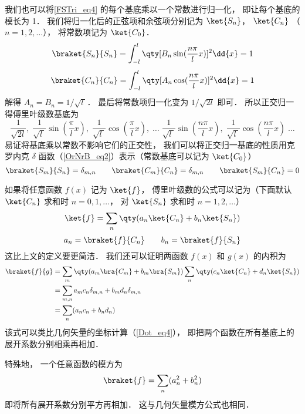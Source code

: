 我们也可以将\autoref{FSTri_eq4} 的每个基底乘以一个常数进行归一化， 即让每个基底的模长为 1． 我们将归一化后的正弦项和余弦项分别记为 $\ket{S_n}$， $\ket{C_n}$ （$n = 1, 2,\dots$）， 将常数项记为 $\ket{C_0}$．
\begin{equation}
\braket{S_n}{S_n} = \int_{-l}^l \qty[B_n \sin(\frac{n\pi}{l}x)]^2 \dd{x} = 1
\end{equation}
\begin{equation}
\braket{C_n}{C_n} = \int_{-l}^l \qty[A_n \cos(\frac{n\pi}{l}x)]^2 \dd{x} = 1
\end{equation}
解得 $A_n = B_n = 1/\sqrt{l\ }$． 最后将常数项归一化变为 $1/\sqrt{2l}$ 即可． 所以正交归一得傅里叶级数基底为
\begin{equation}
\frac{1}{\sqrt{2l}},\;   \frac{1}{\sqrt{l\ }}\sin(\frac{\pi}{l} x),\;   \frac{1}{\sqrt{l\ }}\cos(\frac{\pi}{l} x),\;   \dots\;  \frac{1}{\sqrt{l\ }}\sin(\frac{n\pi}{l} x),\;   \frac{1}{\sqrt{l\ }}\cos(\frac{n\pi}{l} x)\;   \dots
\end{equation}
易证将基底乘以常数不影响它们的正交性， 我们可以将正交归一基底的性质用克罗内克 $\delta$ 函数（\autoref{OrNrB_eq2}）表示（常数基底可以记为 $\ket{C_0}$）
\begin{equation}
\braket{S_m}{S_n} = \delta_{m,n}
\qquad
\braket{C_m}{C_n} = \delta_{m, n}
\qquad
\braket{S_m}{C_n} = 0
\end{equation}

如果将任意函数 $f(x)$ 记为 $\ket{f}$， 傅里叶级数的公式可以记为（下面默认 $\ket{C_n}$ 求和时 $n = 0, 1, \dots$， 对 $\ket{S_n}$ 求和时 $n = 1, 2, \dots$）
\begin{equation}
\ket{f} = \sum_n \qty(a_n \ket{C_n} + b_n \ket{S_n})
\end{equation}
\begin{equation}
a_n = \braket{f}{C_n}
\qquad
b_n = \braket{f}{S_n}
\end{equation}
这比上文的定义要更简洁． 我们还可以证明两函数 $f(x)$ 和 $g(x)$ 的内积为
\begin{equation}
\begin{aligned}
\braket{f}{g} &= \sum_m \qty(a_m \bra{C_m} + b_m \bra{S_m}) \sum_n \qty(c_n \ket{C_n} + d_n \ket{S_n})\\
&= \sum_{m, n} a_m c_n \delta_{m, n} + b_m d_n \delta_{m, n}\\
&= \sum_n (a_n c_n + b_n d_n)
\end{aligned}
\end{equation}
该式可以类比几何矢量的坐标计算（\autoref{Dot_eq4}）， 即把两个函数在所有基底上的展开系数分别相乘再相加．

特殊地， 一个任意函数的模方为
\begin{equation}
\braket{f} = \sum_n (a_n^2 + b_n^2)
\end{equation}
即将所有展开系数分别平方再相加． 这与几何矢量模方公式也相同．

